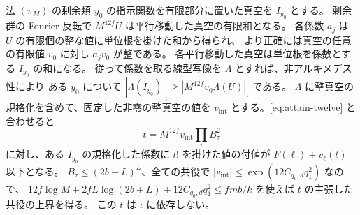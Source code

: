 法 \((\pi_M)\) の剰余類 \(y_0\) の指示関数を有限部分に置いた真空を \(I_{y_0}\) とする。
剰余群の Fourier 反転で \(M^{12f}U\) は平行移動した真空の有限和となる。
各係数 \(a_j\) は \(U\) の有限個の整な値に単位根を掛けた和から得られ、
より正確には真空の任意の有限値 \(v_0\) に対し \(a_jv_0\) が整である。
各平行移動した真空は単位根を係数とする \(I_{y_0}\) の和になる。
従って係数を取る線型写像を \(\Lambda\) とすれば、非アルキメデス性により
ある \(y_0\) について
\(
 |\Lambda(I_{y_0})|_\iota\ge|M^{12f} v_0\Lambda(U)|_\iota
\)
である。 \(\Lambda\) に整真空の規格化を含めて、固定した非零の整真空の値を
\(v_\mathrm{int}\) とする。\eqref{eq:attain-twelve} と合わせると
\[
 t=M^{12f}v_\mathrm{int}\prod_\tau B_\tau^2
\]
に対し、ある \(I_{y_0}\) の規格化した係数に \(l!\) を掛けた値の付値が
\(F(\ell)+v_\ell(t)\) 以下となる。
\(B_\tau\le (2b+L)^L\)、全ての共役で
\(|v_\mathrm{int}|\le\exp(12C_{q_0,d}q_1^2)\) なので、
\(12f\log M+2fL\log(2b+L)+12C_{q_0,d}q_1^2\le fmb/k\)
を使えば \(t\) の主張した共役の上界を得る。
この \(t\) は \(\iota\) に依存しない。
